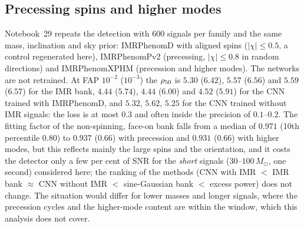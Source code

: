 \subsection{Precessing spins and higher modes}\label{sec:prec}
Notebook~29 repeats the detection with $600$ signals per family and the same mass, inclination and sky prior: IMRPhenomD with aligned spins ($|\chi|\le0.5$, a control regenerated here), IMRPhenomPv2 (precessing, $|\chi|\le0.8$ in random directions) and IMRPhenomXPHM (precession and higher modes). The networks are not retrained. At FAP $10^{-2}$ ($10^{-3}$) the $\rho_{50}$ is $5.30$ ($6.42$), $5.57$ ($6.56$) and $5.59$ ($6.57$) for the IMR bank, $4.44$ ($5.74$), $4.44$ ($6.00$) and $4.52$ ($5.91$) for the CNN trained with IMRPhenomD, and $5.32$, $5.62$, $5.25$ for the CNN trained without IMR signals: the loss is at most $0.3$ and often inside the precision of $0.1$--$0.2$. The fitting factor of the non-spinning, face-on bank falls from a median of $0.971$ (10th percentile $0.80$) to $0.937$ ($0.66$) with precession and $0.931$ ($0.66$) with higher modes, but this reflects mainly the large spins and the orientation, and it costs the detector only a few per cent of SNR for the \emph{short} signals ($30$--$100\,M_\odot$, one second) considered here; the ranking of the methods (CNN with IMR $<$ IMR bank $\approx$ CNN without IMR $<$ sine-Gaussian bank $<$ excess power) does not change. The situation would differ for lower masses and longer signals, where the precession cycles and the higher-mode content are within the window, which this analysis does not cover.

